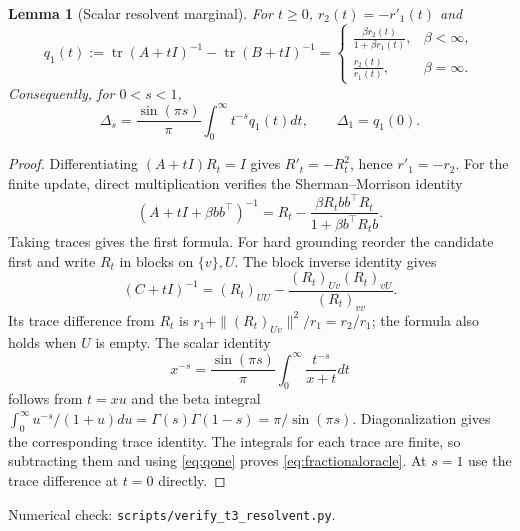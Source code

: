 \documentclass[11pt]{article}
\newtheorem{lemma}[theorem]{Lemma}
\DeclareMathOperator{\tr}{tr}
\begin{document}
\begin{lemma}[Scalar resolvent marginal]\label{lem:resolvent}
For $t\geq0$, $r_2(t)=-r'_1(t)$ and
\begin{equation}\label{eq:qone}
 q_1(t):=\tr(A+tI)^{-1}-\tr(B+tI)^{-1}
 =\begin{cases}
 \displaystyle\frac{\beta r_2(t)}{1+\beta r_1(t)},&\beta<\infty,\\[6pt]
 \displaystyle\frac{r_2(t)}{r_1(t)},&\beta=\infty.
 \end{cases}
\end{equation}
Consequently, for $0<s<1$,
\begin{equation}\label{eq:fractionaloracle}
 \Delta_s=\frac{\sin(\pi s)}{\pi}
              \int_0^\infty t^{-s}q_1(t)dt,
 \qquad \Delta_1=q_1(0).
\end{equation}
\end{lemma}
\begin{proof}
Differentiating $(A+tI)R_t=I$ gives $R'_t=-R_t^2$, hence
$r'_1=-r_2$. For the finite update, direct multiplication verifies
the Sherman--Morrison identity
\[
 (A+tI+\beta bb^\top)^{-1}
 =R_t-\frac{\beta R_tbb^\top R_t}{1+\beta b^\top R_tb}.
\]
Taking traces gives the first formula. For hard grounding reorder
the candidate first and write $R_t$ in blocks on $\{v\},U$. The
block inverse identity gives
\[
 (C+tI)^{-1}=(R_t)_{UU}
       -\frac{(R_t)_{Uv}(R_t)_{vU}}{(R_t)_{vv}}.
\]
Its trace difference from $R_t$ is
$r_1+\|(R_t)_{Uv}\|^2/r_1=r_2/r_1$; the formula also holds when
$U$ is empty. The scalar identity
\[
 x^{-s}=\frac{\sin(\pi s)}{\pi}
           \int_0^\infty\frac{t^{-s}}{x+t}dt
\]
follows from $t=xu$ and the beta integral
$\int_0^\infty u^{-s}/(1+u)du=\Gamma(s)\Gamma(1-s)=\pi/\sin(\pi s)$.
Diagonalization gives the corresponding trace identity. The integrals
for each trace are finite, so subtracting them and using
\eqref{eq:qone} proves \eqref{eq:fractionaloracle}. At $s=1$ use
the trace difference at $t=0$ directly.
\end{proof}
\noindent Numerical check: \texttt{scripts/verify\_t3\_resolvent.py}.
\end{document}
